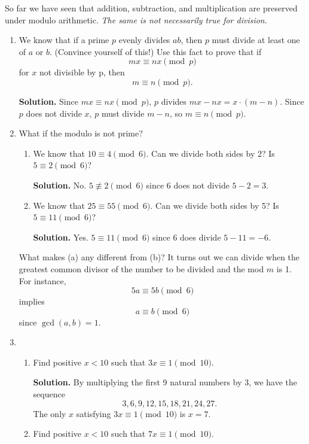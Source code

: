 \documentclass[11pt]{article}
\theoremstyle{definition}
\begin{document}
So far we have seen that addition, subtraction, and multiplication
are preserved under modulo arithmetic. \textit{The same is not
necessarily true for division}.

\begin{enumerate} \addtocounter{enumi}{\value{problem_count}}

\item \addtocounter{problem_count}{1}
We know that if a prime $p$ evenly divides $ab$, then $p$ must divide at least one of $a$ or $b$. (Convince yourself of this!) Use this fact to prove that if
\[mx \equiv nx \pmod{p}\]
for $x$ not divisible by p, then
\[m \equiv n \pmod{p}.\]

\textbf{Solution.}
Since $mx \equiv nx \pmod{p}$, $p$ divides $mx - nx = x \cdot (m - n)$. Since $p$ does not divide $x$, $p$ must divide $m - n$, so $m \equiv n \pmod{p}$.

\item \addtocounter{problem_count}{1}
What if the modulo is not prime?
\begin{enumerate}
\item We know that $10 \equiv 4 \pmod{6}$. Can we divide both sides by 2? Is
$5 \equiv 2 \pmod{6}$?

\textbf{Solution.}
No. $5 \not\equiv 2 \pmod{6}$ since $6$ does not divide $5 - 2 = 3$.

\item We know that $25 \equiv 55 \pmod{6}$. Can we divide both sides by 5? Is
$5 \equiv 11 \pmod{6}$?

\textbf{Solution.}
Yes. $5 \equiv 11 \pmod{6}$ since $6$ does divide $5 - 11 = -6$.

\end{enumerate}
What makes (a) any different from (b)? It turns out we can divide
when the greatest common divisor of the number to be divided and the mod $m$ is 1. For instance,
\[ 5a \equiv 5b \pmod{6} \]
implies
\[ a \equiv b \pmod{6} \]
since $\gcd( a, b ) = 1.$

\item \addtocounter{problem_count}{1}
\begin{enumerate}
\item Find positive $x < 10$ such that $3x \equiv 1 \pmod{10}$.

\textbf{Solution.}
By multiplying the first 9 natural numbers by 3, we have the sequence
\[3, 6, 9, 12, 15, 18, 21, 24, 27.\]
The only $x$ satisfying $3x \equiv 1 \pmod{10}$ is $x = 7$.

\item Find positive $x < 10$ such that $7x \equiv 1 \pmod{10}$.


\end{enumerate}
\end{enumerate}
\end{document}
